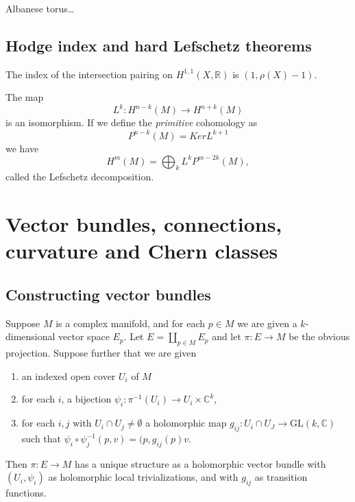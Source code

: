 \begin{definition}
\label{definition-albanese-torus}
Albanese torus…
\end{definition}

\subsection{Hodge index and hard Lefschetz
theorems}
\label{subsection-hodge-index-hard-lefschetz}

\begin{theorem}
\label{theorem-hodge-index}
The index of the intersection pairing on
$H^{1,1}(X,\mathbb{R})$
is $(1,\rho(X)-1)$.
\end{theorem}

\begin{theorem}
\label{theorem-hard-lefschetz}
\begin{reference}
\cite[p. 122]{gri}
\end{reference}
The map
$$
L^k:H^{n-k}(M) \to H^{n+k}(M)
$$
is an isomorphism.
If we define the {\it primitive} cohomology
as
$$
P^{n-k}(M) = Ker L^{k+1}
$$
we have
$$
H^m(M)=\bigoplus_k L^kP^{m-2k}(M),
$$
called the Lefschetz decomposition.
\end{theorem}

\section{Vector bundles, connections,
curvature and Chern classes}
\label{section-vector-bundles}

\subsection{Constructing vector bundles}
\label{subsection-constructing-vector-bundles}

\begin{lemma}
\label{lemma-vector-bundle-from-fibers}
\begin{reference}
\cite[Lemma 3.4]{lec}
\end{reference}
Suppose $M$ is a complex manifold,
and for each $p \in M$ we are given a
$k$-dimensional vector space $E_p$.
Let $E=\coprod_{p \in M}E_p$ and let $\pi:E
\to M$ be the obvious projection.
Suppose further that we are given
\begin{enumerate}
\item an indexed open cover $U_i$ of $M$
\item for each $i$, a bijection $
\psi_i:\pi^{-1}(U_i) \to U_i
\times\mathbb{C}^k$,
\item for each $i,j$ with $U_i\cap U_j \neq
\emptyset$
a holomorphic map $g_{ij}:U_i \cap U_J \to
\text{GL}(k,\mathbb{C})$
such that $\psi_i\circ
\psi_j^{-1}(p,v)=(p,g_{ij}(p)v$.
\end{enumerate}
\noindent
Then $\pi:E \to M$ has a unique structure as
a holomorphic vector bundle
with $(U_i,\psi_i)$ as holomorphic local
trivializations,
and with $g_{ij}$ as transition functions.
\end{lemma}

